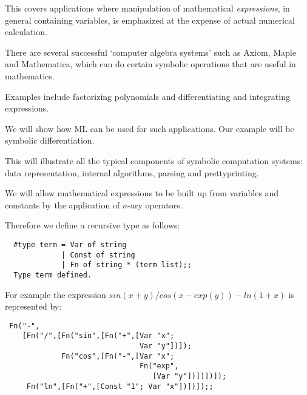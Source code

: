 \begin{slide*}


\vspace*{0.5cm}

This covers applications where manipulation of mathematical {\em expressions},
in general containing variables, is emphasized at the expense of actual
numerical calculation.

There are several successful `computer algebra systems' such as
Axiom, Maple and Mathematica, which can do certain symbolic operations that are
useful in mathematics.

Examples include factorizing polynomials and differentiating and integrating
expressions.

We will show how ML can be used for such applications. Our example will be
symbolic differentiation.

This will illustrate all the typical components of symbolic computation
systems: data representation, internal algorithms, parsing and prettyprinting.

\end{slide*}


\begin{slide*}


\vspace*{0.5cm}

We will allow mathematical expressions to be built up from variables and
constants by the application of $n$-ary operators.

Therefore we define a recursive type as follows:

\begin{black}\begin{verbatim}
  #type term = Var of string
             | Const of string
             | Fn of string * (term list);;
  Type term defined.
\end{verbatim}\end{black}

For example the expression {\red $sin(x + y) / cos(x - exp(y)) - ln(1 + x)$} is
represented by:

\begin{black}\begin{footnotesize}\begin{verbatim}
 Fn("-",
    [Fn("/",[Fn("sin",[Fn("+",[Var "x";
                               Var "y"])]);
             Fn("cos",[Fn("-",[Var "x";
                               Fn("exp",
                                  [Var "y"])])])]);
     Fn("ln",[Fn("+",[Const "1"; Var "x"])])]);;
\end{verbatim}\end{footnotesize}\end{black}

\end{slide*}



